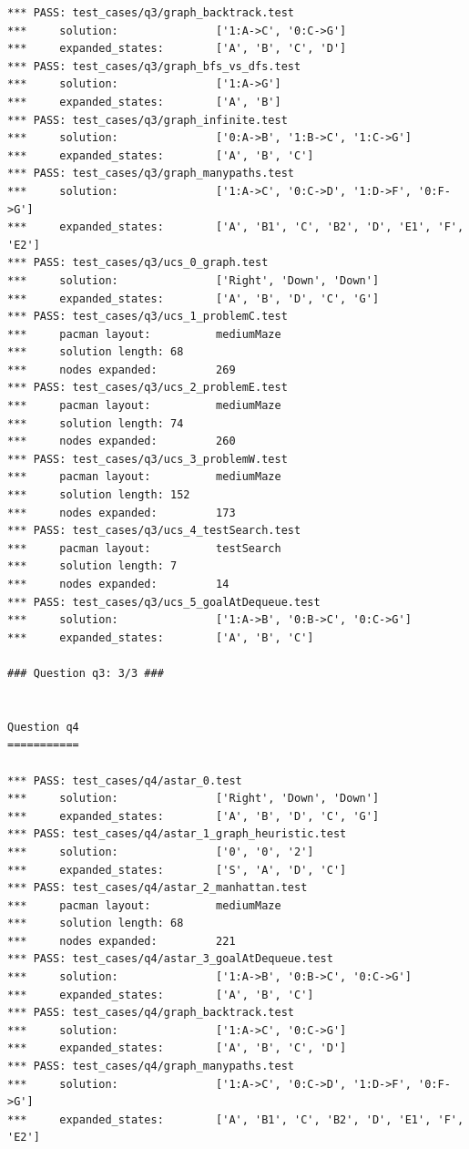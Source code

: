 \documentclass{report}
\begin{document}
\begin{lstlisting}
*** PASS: test_cases/q3/graph_backtrack.test
***     solution:               ['1:A->C', '0:C->G']
***     expanded_states:        ['A', 'B', 'C', 'D']
*** PASS: test_cases/q3/graph_bfs_vs_dfs.test
***     solution:               ['1:A->G']
***     expanded_states:        ['A', 'B']
*** PASS: test_cases/q3/graph_infinite.test
***     solution:               ['0:A->B', '1:B->C', '1:C->G']
***     expanded_states:        ['A', 'B', 'C']
*** PASS: test_cases/q3/graph_manypaths.test
***     solution:               ['1:A->C', '0:C->D', '1:D->F', '0:F->G']
***     expanded_states:        ['A', 'B1', 'C', 'B2', 'D', 'E1', 'F', 'E2']
*** PASS: test_cases/q3/ucs_0_graph.test
***     solution:               ['Right', 'Down', 'Down']
***     expanded_states:        ['A', 'B', 'D', 'C', 'G']
*** PASS: test_cases/q3/ucs_1_problemC.test
***     pacman layout:          mediumMaze
***     solution length: 68
***     nodes expanded:         269
*** PASS: test_cases/q3/ucs_2_problemE.test
***     pacman layout:          mediumMaze
***     solution length: 74
***     nodes expanded:         260
*** PASS: test_cases/q3/ucs_3_problemW.test
***     pacman layout:          mediumMaze
***     solution length: 152
***     nodes expanded:         173
*** PASS: test_cases/q3/ucs_4_testSearch.test
***     pacman layout:          testSearch
***     solution length: 7
***     nodes expanded:         14
*** PASS: test_cases/q3/ucs_5_goalAtDequeue.test
***     solution:               ['1:A->B', '0:B->C', '0:C->G']
***     expanded_states:        ['A', 'B', 'C']

### Question q3: 3/3 ###


Question q4
===========

*** PASS: test_cases/q4/astar_0.test
***     solution:               ['Right', 'Down', 'Down']
***     expanded_states:        ['A', 'B', 'D', 'C', 'G']
*** PASS: test_cases/q4/astar_1_graph_heuristic.test
***     solution:               ['0', '0', '2']
***     expanded_states:        ['S', 'A', 'D', 'C']
*** PASS: test_cases/q4/astar_2_manhattan.test
***     pacman layout:          mediumMaze
***     solution length: 68
***     nodes expanded:         221
*** PASS: test_cases/q4/astar_3_goalAtDequeue.test
***     solution:               ['1:A->B', '0:B->C', '0:C->G']
***     expanded_states:        ['A', 'B', 'C']
*** PASS: test_cases/q4/graph_backtrack.test
***     solution:               ['1:A->C', '0:C->G']
***     expanded_states:        ['A', 'B', 'C', 'D']
*** PASS: test_cases/q4/graph_manypaths.test
***     solution:               ['1:A->C', '0:C->D', '1:D->F', '0:F->G']
***     expanded_states:        ['A', 'B1', 'C', 'B2', 'D', 'E1', 'F', 'E2']


\end{lstlisting}
\end{document}
